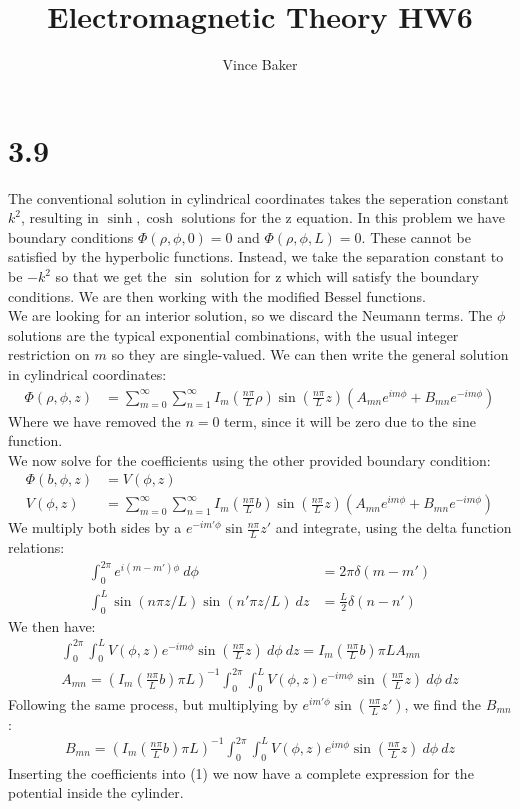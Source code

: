 \documentclass[a4paper,11pt]{article}
\title{Electromagnetic Theory HW6}
\author{Vince Baker}
\numberwithin{equation}{section}
\newcommand{\lrp}[1]{\left({#1}\right)}
\begin{document}
\maketitle

\section{3.9}
The conventional solution in cylindrical coordinates takes the seperation constant $k^2$, resulting in $\sinh, \cosh$ solutions for the z equation.
In this problem we have boundary conditions $\Phi(\rho,\phi,0)=0$ and $\Phi(\rho,\phi,L)=0$.
These cannot be satisfied by the hyperbolic functions.
Instead, we take the separation constant to be $-k^2$ so that we get the $\sin$ solution for z which will satisfy the boundary conditions.
We are then working with the modified Bessel functions.\\
We are looking for an interior solution, so we discard the Neumann terms. 
The $\phi$ solutions are the typical exponential combinations, with the usual integer restriction on $m$ so they are single-valued.
We can then write the general solution in cylindrical coordinates:
\begin{align}
 \Phi(\rho,\phi,z) &= \sum_{m=0}^\infty \sum_{n=1}^\infty I_m(\frac{n\pi}{L}\rho)\sin{\lrp{\frac{n\pi}{L}z}}\lrp{A_{mn}e^{im\phi}+B_{mn}e^{-im\phi}}
\end{align}
Where we have removed the $n=0$ term, since it will be zero due to the sine function.\\
We now solve for the coefficients using the other provided boundary condition:
\begin{align}
 \Phi(b,\phi,z) &= V(\phi,z)\\
 V(\phi,z) &= \sum_{m=0}^\infty \sum_{n=1}^\infty I_m(\frac{n\pi}{L}b)\sin{\lrp{\frac{n\pi}{L}z}}\lrp{A_{mn}e^{im\phi}+B_{mn}e^{-im\phi}}
\end{align}
We multiply both sides by a $e^{-im'\phi}\sin{\frac{n\pi}{L}z'}$ and integrate, using the delta function relations:
\begin{align}
 \int_0^{2\pi} e^{i(m-m')\phi}\ d\phi &= 2\pi\delta(m-m')\\
 \int_0^L \sin(n\pi z/L)\sin(n'\pi z/L)\ dz &= \frac{L}{2}\delta(n-n')
\end{align}
We then have:
\begin{gather}
 \int_0^{2\pi} \int_0^L V(\phi,z)e^{-im\phi}\sin{\lrp{\frac{n\pi}{L}z}}\ d\phi\ dz =  I_m(\frac{n\pi}{L}b) \pi L A_{mn}\\
 A_{mn} = \lrp{I_m(\frac{n\pi}{L}b) \pi L}^{-1} \int_0^{2\pi} \int_0^L V(\phi,z)e^{-im\phi}\sin{\lrp{\frac{n\pi}{L}z}}\ d\phi\ dz
\end{gather}
Following the same process, but multiplying by $e^{im'\phi}\sin{\lrp{\frac{n\pi}{L}z'}}$, we find the $B_{mn}$:
\begin{gather}
 B_{mn} = \lrp{I_m(\frac{n\pi}{L}b) \pi L}^{-1} \int_0^{2\pi} \int_0^L V(\phi,z)e^{im\phi}\sin{\lrp{\frac{n\pi}{L}z}}\ d\phi\ dz
\end{gather}
Inserting the coefficients into (1) we now have a complete expression for the potential inside the cylinder.
\end{document}
